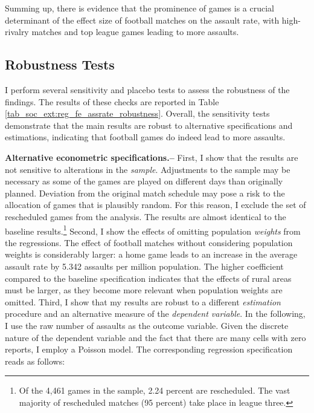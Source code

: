 Summing up, there is evidence that the prominence of games is a crucial determinant of the effect size of football matches on the assault rate, with high-rivalry matches and top league games leading to more assaults.













\subsection{Robustness Tests}
I perform several sensitivity and placebo tests to assess the robustness of the findings. The results of these checks are reported in Table \ref{tab_soc_ext:reg_fe_assrate_robustness}. Overall, the sensitivity tests demonstrate that the main results are robust to alternative specifications and estimations, indicating that football games do indeed lead to more assaults.\newline




\textbf{Alternative econometric specifications.--} First, I show that the results are not sensitive to alterations in the \textit{sample}. Adjustments to the sample may be necessary as some of the games are played on different days than originally planned. Deviation from the original match schedule may pose a risk to the allocation of games that is plausibly random. For this reason, I exclude the set of rescheduled games from the analysis. The results are almost identical to the baseline results.\footnote{Of the 4,461 games in the sample, 2.24 percent are rescheduled. The vast majority of rescheduled matches (95 percent) take place in league three.} Second, I show the effects of omitting population \textit{weights} from the regressions. The effect of football matches without considering population weights is considerably larger: a home game leads to an increase in the average assault rate by 5.342 assaults per million population. The higher coefficient compared to the baseline specification indicates that the effects of rural areas must be larger, as they become more relevant when population weights are omitted. Third, I show that my results are robust to a different \textit{estimation} procedure and an alternative measure of the \textit{dependent variable}. In the following, I use the raw number of assaults as the outcome variable. Given the discrete nature of the dependent variable and the fact that there are many cells with zero reports, I employ a Poisson model. The corresponding regression specification reads as follows:

